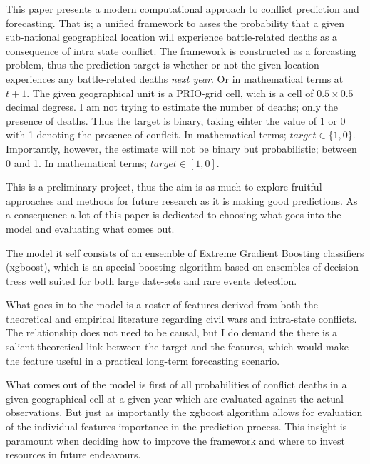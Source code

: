 \documentclass[a4paper]{article}
\begin{document}
This paper presents a modern computational approach to conflict prediction and forecasting. That is; a unified framework to asses the probability that a given sub-national geographical location will experience battle-related deaths as a consequence of intra state conflict. The framework is constructed as a forcasting problem, thus the prediction target is whether or not the given location experiences any battle-related deaths \emph{next year}. Or in mathematical terms at $t+1$. The given geographical unit is a PRIO-grid cell, wich is a cell of $0.5\times0.5$ decimal degress. I am not trying to estimate the number of deaths; only the presence of deaths. Thus the target is binary, taking eihter the value of 1 or 0 with 1 denoting the presence of conflcit. In mathematical terms; $target\in\{1,0\}$. Importantly, however, the estimate will not be binary but probabilistic; between 0 and 1. In mathematical terms; $target\in[1,0]$.\par

This is a preliminary project, thus the aim is as much to explore fruitful approaches and methods for future research as it is making good predictions. As a consequence a lot of this paper is dedicated to choosing what goes into the model and evaluating what comes out.\par

The model it self consists of an ensemble of Extreme Gradient Boosting classifiers (xgboost), which is an special boosting algorithm based on ensembles of decision tress well suited for both large date-sets and rare events detection.\par

What goes in to the model is a roster of features derived from both the theoretical and empirical literature regarding civil wars and intra-state conflicts. The relationship does not need to be causal, but I do demand the there is a salient theoretical link between the target and the features, which would make the feature useful in a practical long-term forecasting scenario.\par

What comes out of the model is first of all probabilities of conflict deaths in a given geographical cell at a given year which are evaluated against the actual observations. But just as importantly the xgboost algorithm allows for evaluation of the individual features importance in the prediction process. This insight is paramount when deciding how to improve the framework and where to invest resources in future endeavours.\par
\end{document}

